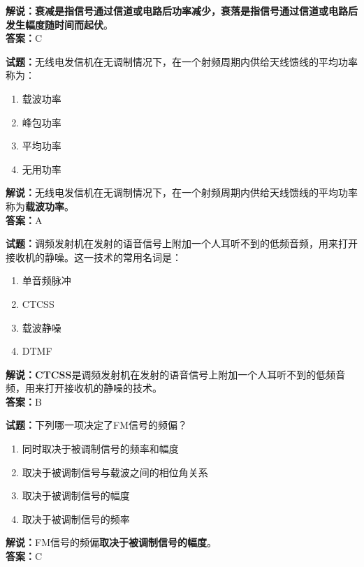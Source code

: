 \documentclass{ctexbook}
\begin{document}
\noindent\textbf{解说：}\textbf{衰减是指信号通过信道或电路后功率减少，衰落是指信号通过信道或电路后发生幅度随时间而起伏}。\\\noindent\textbf{答案：}C%

\bigskip

\noindent\textbf{试题：}无线电发信机在无调制情况下，在一个射频周期内供给天线馈线的平均功率称为：

\begin{enumerate}[leftmargin=3em]
  \item 载波功率
  \item 峰包功率
  \item 平均功率
  \item 无用功率
\end{enumerate}

\noindent\textbf{解说：}无线电发信机在无调制情况下，在一个射频周期内供给天线馈线的平均功率称为\textbf{载波功率}。\\\noindent\textbf{答案：}A%

\bigskip

\noindent\textbf{试题：}调频发射机在发射的语音信号上附加一个人耳听不到的低频音频，用来打开接收机的静噪。这一技术的常用名词是：

\begin{enumerate}[leftmargin=3em]
  \item 单音频脉冲
  \item CTCSS
  \item 载波静噪
  \item DTMF
\end{enumerate}

\noindent\textbf{解说：}\textbf{CTCSS}是调频发射机在发射的语音信号上附加一个人耳听不到的低频音频，用来打开接收机的静噪的技术。\\\noindent\textbf{答案：}B%

\bigskip

\noindent\textbf{试题：}下列哪一项决定了FM信号的频偏？

\begin{enumerate}[leftmargin=3em]
  \item 同时取决于被调制信号的频率和幅度
  \item 取决于被调制信号与载波之间的相位角关系
  \item 取决于被调制信号的幅度
  \item 取决于被调制信号的频率
\end{enumerate}

\noindent\textbf{解说：}FM信号的频偏\textbf{取决于被调制信号的幅度}。\\\noindent\textbf{答案：}C%
\end{document}
